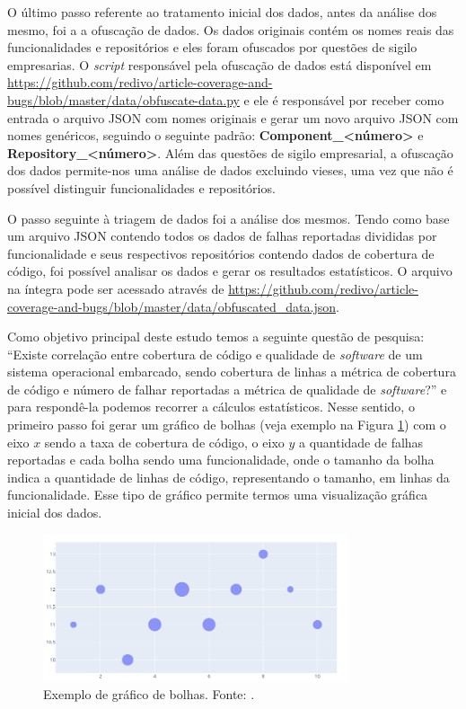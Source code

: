\documentclass[11.5pt]{article}
\begin{document}
O último passo referente ao tratamento inicial dos dados, antes da análise dos mesmo, foi a
a ofuscação de dados.
Os dados originais contém os nomes reais das funcionalidades e repositórios e eles foram ofuscados
por questões de sigilo empresarias.
O \textit{script} responsável pela ofuscação de dados está disponível em
\url{https://github.com/redivo/article-coverage-and-bugs/blob/master/data/obfuscate-data.py}
e ele é responsável por receber como entrada o arquivo JSON com nomes originais e gerar um novo
arquivo JSON com nomes genéricos, seguindo o seguinte padrão:
\textbf{Component\_\textless número\textgreater} e
\textbf{Repository\_\textless número\textgreater}.
Além das questões de sigilo empresarial, a ofuscação dos dados permite-nos uma análise de dados
excluindo vieses, uma vez que não é possível distinguir funcionalidades e repositórios.

O passo seguinte à triagem de dados foi a análise dos mesmos.
Tendo como base um arquivo JSON contendo todos os dados de falhas reportadas divididas por
funcionalidade e seus respectivos repositórios contendo dados de cobertura de código, foi possível
analisar os dados e gerar os resultados estatísticos.
O arquivo na íntegra pode ser acessado através de
\url{https://github.com/redivo/article-coverage-and-bugs/blob/master/data/obfuscated_data.json}.

Como objetivo principal deste estudo temos a seguinte questão de pesquisa:
``Existe correlação entre cobertura de código e qualidade de \textit{software} de um sistema
operacional embarcado, sendo cobertura de linhas a métrica de cobertura de código e número de falhar
reportadas a métrica de qualidade de \textit{software}?'' e para respondê-la podemos recorrer a
cálculos estatísticos.
Nesse sentido, o primeiro passo foi gerar um gráfico de bolhas (veja exemplo na
Figura \ref{fig:bubble_example}) com o eixo $x$ sendo a taxa de cobertura de código, o eixo $y$ a
quantidade de falhas reportadas e cada bolha sendo uma funcionalidade, onde o tamanho da bolha
indica a quantidade de linhas de código, representando o tamanho, em linhas da funcionalidade.
Esse tipo de gráfico permite termos uma visualização gráfica inicial dos dados.

\begin{figure}[ht]
    \centering
    \includegraphics[width=0.8\textwidth]{bubble_example.png}
    \caption{Exemplo de gráfico de bolhas. Fonte: \cite{plotly}.}
    \label{fig:bubble_example}
\end{figure}
\end{document}
